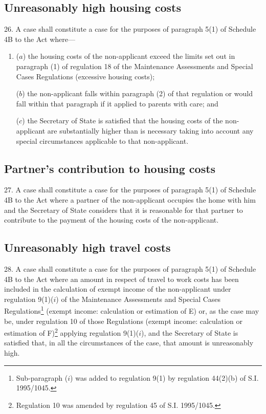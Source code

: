 \documentclass[12pt,a4paper]{article}
\begin{document}
\subsection[26. Unreasonably high housing costs]{Unreasonably high housing costs}

26. A case shall constitute a case for the
purposes of paragraph 5(1) of Schedule 4B to the Act where—
\begin{enumerate}\item[]
($a$) the housing costs of the non-applicant exceed the limits set out in paragraph
(1) of regulation 18 of the Maintenance Assessments and Special Cases
Regulations (excessive housing costs);

($b$) the non-applicant falls within paragraph (2) of that regulation or would fall
within that paragraph if it applied to parents with care; and

($c$) the Secretary of State is satisfied that the housing costs of the
non-applicant are substantially higher than is necessary taking into account any
special circumstances applicable to that non-applicant.
\end{enumerate}

\subsection[27. Partner’s contribution to housing costs]{Partner’s contribution to housing costs}

27. A case shall constitute a case for
the purposes of paragraph 5(1) of Schedule 4B to the Act where a partner of the
non-applicant occupies the home with him and the Secretary of State considers
that it is reasonable for that partner to contribute to the payment of the
housing costs of the non-applicant.

\subsection[28. Unreasonably high travel costs]{Unreasonably high travel costs}

28. A case shall constitute a case for the
purposes of paragraph 5(1) of Schedule 4B to the Act where an amount in respect
of travel to work costs has been included in the calculation of exempt income of
the non-applicant under regulation 9(1)($i$) of the Maintenance Assessments and
Special Cases Regulations\footnote{\frenchspacing Sub-paragraph ($i$) was added to regulation 9(1) by regulation 44(2)(b) of S.I. 1995/1045.} (exempt income: calculation or estimation of E)
or, as the case may be, under regulation 10 of those Regulations (exempt income:
calculation or estimation of F)\footnote{\frenchspacing Regulation 10 was amended by regulation 45 of S.I. 1995/1045.} applying regulation 9(1)($i$), and the
Secretary of State is satisfied that, in all the circumstances of the case, that
amount is unreasonably high.
\end{document}
